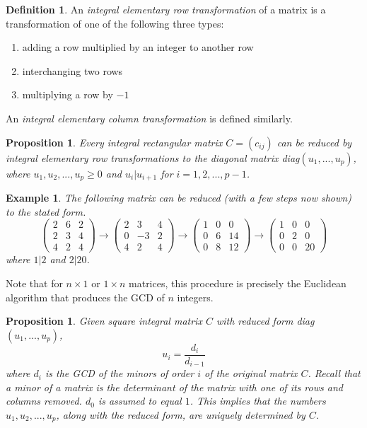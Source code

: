 \documentclass{article}
\newtheorem{proposition}[theorem]{Proposition}
\newtheorem{example}{Example}[section]
\theoremstyle{remark}
\theoremstyle{definition}
\newtheorem{definition}{Definition}[section]
\begin{document}
\begin{definition}
An \textit{integral elementary row transformation} of a matrix is a transformation of one of the following three types: 
\begin{enumerate}
    \item adding a row multiplied by an integer to another row
    \item interchanging two rows
    \item multiplying a row by $-1$ 
\end{enumerate}
An \textit{integral elementary column transformation} is defined similarly. 
\end{definition}

\begin{proposition}
Every integral rectangular matrix $C = (c_{i j})$ can be reduced by integral elementary row transformations to the diagonal matrix diag$(u_1, ..., u_p)$, where $u_1, u_2, ..., u_p \geq 0$ and $u_i | u_{i+1}$ for $i = 1, 2, ..., p -1$. 
\end{proposition}

\begin{example}
The following matrix can be reduced (with a few steps now shown) to the stated form. 
\[\begin{pmatrix} 2&6&2 \\ 2&3&4 \\ 4&2&4 \end{pmatrix} \rightarrow 
\begin{pmatrix} 2&3&4 \\ 0&-3&2 \\ 4&2&4 \end{pmatrix} \rightarrow
\begin{pmatrix} 1&0&0 \\ 0&6&14 \\ 0&8&12 \end{pmatrix} \rightarrow
\begin{pmatrix} 1&0&0 \\ 0&2&0 \\ 0&0&20\end{pmatrix}
\]
where $1|2$ and $2|20$. 
\end{example}

Note that for $n \times 1$ or $1 \times n$ matrices, this procedure is precisely the Euclidean algorithm that produces the GCD of $n$ integers. 

\begin{proposition}
Given square integral matrix $C$ with  reduced form diag$(u_1, ..., u_p)$, 
\[ u_i = \frac{d_i}{d_{i-1}}\]
where $d_i$ is the GCD of the minors of order $i$ of the original matrix $C$. Recall that a minor of a matrix is the determinant of the matrix with one of its rows and columns removed. $d_0$ is assumed to equal $1$. This implies that the numbers $u_1, u_2, ..., u_p$, along with the reduced form, are uniquely determined by $C$. 
\end{proposition}
\end{document}
